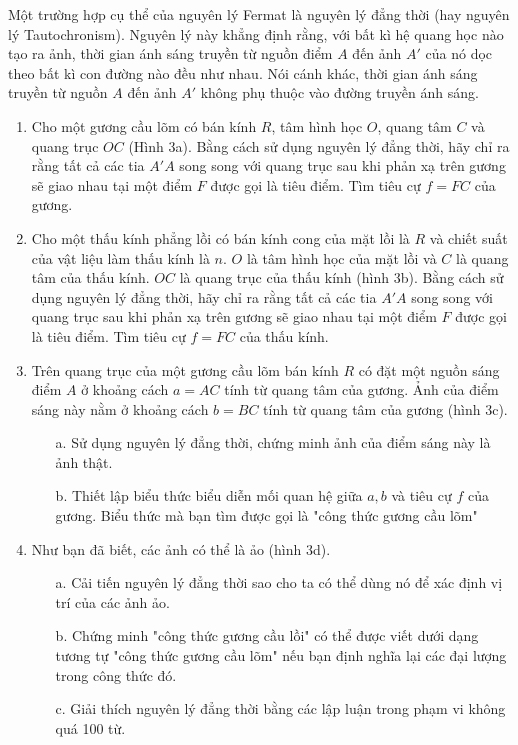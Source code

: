 \noindent Một trường hợp cụ thể của nguyên lý Fermat là nguyên lý đẳng thời (hay nguyên lý Tautochronism). Nguyên lý này khẳng định rằng, với bất kì hệ quang học nào tạo ra ảnh, thời gian ánh sáng truyền từ nguồn điểm $A$ đến ảnh $A'$ của nó dọc theo bất kì con đường nào đều như nhau. Nói cánh khác, thời gian ánh sáng truyền từ nguồn $A$ đến ảnh $A'$ không phụ thuộc vào đường truyền ánh sáng.
\begin{enumerate}
  \item Cho một gương cầu lõm có bán kính $R$, tâm hình học $O$, quang tâm $C$ và quang trục $OC$ (Hình 3a). Bằng cách sử dụng nguyên lý đẳng thời, hãy chỉ ra rằng tất cả các tia $A'A$ song song với quang trục sau khi phản xạ trên gương sẽ giao nhau tại một điểm $F$ được gọi là tiêu điểm. Tìm tiêu cự $f=FC$ của gương.
  \item Cho một thấu kính phẳng lồi có bán kính cong của mặt lồi là $R$ và chiết suất của vật liệu làm thấu kính là $n$. $O$ là tâm hình học của mặt lồi và $C$ là quang tâm của thấu kính. $OC$ là quang trục của thấu kính (hình 3b). Bằng cách sử dụng nguyên lý đẳng thời, hãy chỉ ra rằng tất cả các tia $A'A$ song song với quang trục sau khi phản xạ trên gương sẽ giao nhau tại một điểm $F$ được gọi là tiêu điểm. Tìm tiêu cự $f=FC$ của thấu kính.
  \item Trên quang trục của một gương cầu lõm bán kính $R$ có đặt một nguồn sáng điểm $A$ ở khoảng cách $a=AC$ tính từ quang tâm của gương. Ảnh của điểm sáng này nằm ở khoảng cách $b=BC$ tính từ quang tâm của gương (hình 3c).
        \begin{enumerate}
          \item[a.] Sử dụng nguyên lý đẳng thời, chứng minh ảnh của điểm sáng này là ảnh thật.
          \item[b.] Thiết lập biểu thức biểu diễn mối quan hệ giữa $a,b$ và tiêu cự $f$ của gương. Biểu thức mà bạn tìm được gọi là "công thức gương cầu lõm"
        \end{enumerate}
  \item  Như bạn đã biết, các ảnh có thể là ảo (hình 3d).
        \begin{itemize}
          \item[a.] Cải tiến nguyên lý đẳng thời sao cho ta có thể dùng nó để xác định vị trí của các ảnh ảo.
          \item[b.] Chứng minh "công thức gương cầu lồi" có thể được viết dưới dạng tương tự "công thức gương cầu lõm" nếu bạn định nghĩa lại các đại lượng trong công thức đó.
          \item[c.] Giải thích nguyên lý đẳng thời bằng các lập luận trong phạm vi không quá 100 từ.
        \end{itemize}
\end{enumerate}


